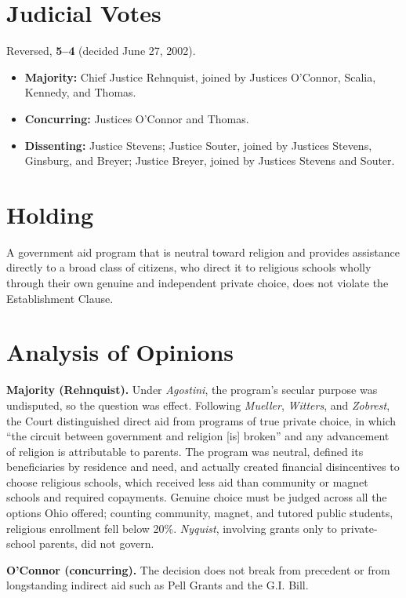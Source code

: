 \documentclass[12pt]{article}
\begin{document}
\section{Judicial Votes}

Reversed, \textbf{5--4} (decided June 27, 2002).
\begin{itemize}
\item \textbf{Majority:} Chief Justice Rehnquist, joined by Justices O'Connor, Scalia, Kennedy, and Thomas.
\item \textbf{Concurring:} Justices O'Connor and Thomas.
\item \textbf{Dissenting:} Justice Stevens; Justice Souter, joined by Justices Stevens, Ginsburg, and Breyer; Justice Breyer, joined by Justices Stevens and Souter.
\end{itemize}

\section{Holding}

A government aid program that is neutral toward religion and provides assistance directly to a broad class of citizens, who direct it to religious schools wholly through their own genuine and independent private choice, does not violate the Establishment Clause.

\section{Analysis of Opinions}

\textbf{Majority (Rehnquist).} Under \textit{Agostini}, the program's secular purpose was undisputed, so the question was effect. Following \textit{Mueller}, \textit{Witters}, and \textit{Zobrest}, the Court distinguished direct aid from programs of true private choice, in which ``the circuit between government and religion [is] broken'' and any advancement of religion is attributable to parents. The program was neutral, defined its beneficiaries by residence and need, and actually created financial disincentives to choose religious schools, which received less aid than community or magnet schools and required copayments. Genuine choice must be judged across all the options Ohio offered; counting community, magnet, and tutored public students, religious enrollment fell below 20\%. \textit{Nyquist}, involving grants only to private-school parents, did not govern.

\textbf{O'Connor (concurring).} The decision does not break from precedent or from longstanding indirect aid such as Pell Grants and the G.I. Bill.
\end{document}
